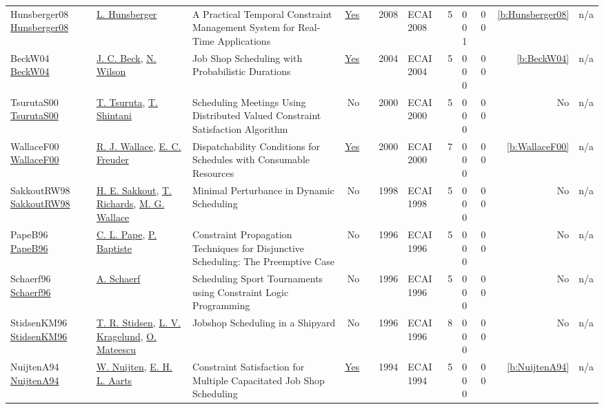 {\begin{longtable}{>{\raggedright\arraybackslash}p{3cm}>{\raggedright\arraybackslash}p{4.5cm}>{\raggedright\arraybackslash}p{6.0cm}rrrp{2.5cm}rp{1cm}p{1cm}rr}
Hunsberger08 \href{https://doi.org/10.3233/978-1-58603-891-5-553}{Hunsberger08} & \hyperref[auth:a1270]{L. Hunsberger} & A Practical Temporal Constraint Management System for Real-Time Applications & \href{../works/Hunsberger08.pdf}{Yes} & \cite{Hunsberger08} & 2008 & ECAI 2008 & 5 & 0 0 1 & 0 0 & \ref{b:Hunsberger08} & n/a\\
BeckW04 \href{}{BeckW04} & \hyperref[auth:a89]{J. C. Beck}, \hyperref[auth:a826]{N. Wilson} & Job Shop Scheduling with Probabilistic Durations & \href{../works/BeckW04.pdf}{Yes} & \cite{BeckW04} & 2004 & ECAI 2004 & 5 & 0 0 0 & 0 0 & \ref{b:BeckW04} & n/a\\
TsurutaS00 \href{}{TsurutaS00} & \hyperref[auth:a1267]{T. Tsuruta}, \hyperref[auth:a1268]{T. Shintani} & Scheduling Meetings Using Distributed Valued Constraint Satisfaction Algorithm & No & \cite{TsurutaS00} & 2000 & ECAI 2000 & 5 & 0 0 0 & 0 0 & No & n/a\\
WallaceF00 \href{}{WallaceF00} & \hyperref[auth:a1269]{R. J. Wallace}, \hyperref[auth:a273]{E. C. Freuder} & Dispatchability Conditions for Schedules with Consumable Resources & \href{../works/WallaceF00.pdf}{Yes} & \cite{WallaceF00} & 2000 & ECAI 2000 & 7 & 0 0 0 & 0 0 & \ref{b:WallaceF00} & n/a\\
SakkoutRW98 \href{}{SakkoutRW98} & \hyperref[auth:a166]{H. E. Sakkout}, \hyperref[auth:a1266]{T. Richards}, \hyperref[auth:a117]{M. G. Wallace} & Minimal Perturbance in Dynamic Scheduling & No & \cite{SakkoutRW98} & 1998 & ECAI 1998 & 5 & 0 0 0 & 0 0 & No & n/a\\
PapeB96 \href{}{PapeB96} & \hyperref[auth:a163]{C. L. Pape}, \hyperref[auth:a162]{P. Baptiste} & Constraint Propagation Techniques for Disjunctive Scheduling: The Preemptive Case & No & \cite{PapeB96} & 1996 & ECAI 1996 & 5 & 0 0 0 & 0 0 & No & n/a\\
Schaerf96 \href{}{Schaerf96} & \hyperref[auth:a1262]{A. Schaerf} & Scheduling Sport Tournaments using Constraint Logic Programming & No & \cite{Schaerf96} & 1996 & ECAI 1996 & 5 & 0 0 0 & 0 0 & No & n/a\\
StidsenKM96 \href{}{StidsenKM96} & \hyperref[auth:a1263]{T. R. Stidsen}, \hyperref[auth:a1264]{L. V. Kragelund}, \hyperref[auth:a1265]{O. Mateescu} & Jobshop Scheduling in a Shipyard & No & \cite{StidsenKM96} & 1996 & ECAI 1996 & 8 & 0 0 0 & 0 0 & No & n/a\\
NuijtenA94 \href{}{NuijtenA94} & \hyperref[auth:a656]{W. Nuijten}, \hyperref[auth:a777]{E. H. L. Aarts} & Constraint Satisfaction for Multiple Capacitated Job Shop Scheduling & \href{../works/NuijtenA94.pdf}{Yes} & \cite{NuijtenA94} & 1994 & ECAI 1994 & 5 & 0 0 0 & 0 0 & \ref{b:NuijtenA94} & n/a\\

\end{longtable}}
